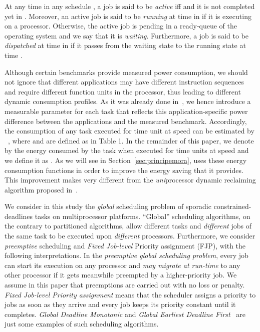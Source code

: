 \documentclass[times, 10pt,twocolumn]{article}
\begin{document}
At any time  in any schedule , a job  is said to be \emph{active} iff  and it is not completed yet in . Moreover, an active job is said to be \emph{running} at time  in  if it is executing on a processor. Otherwise, the active job is pending in a ready-queue of the operating system and we say that it is \emph{waiting}. Furthermore, a job is said to be \emph{dispatched} at time  in  if it passes from the waiting state to the running state at time .

Although certain benchmarks provide measured power consumption, we should not ignore that different applications may have different instruction sequences and require different function units in the processor, thus leading to different dynamic consumption profiles. As it was already done in~\cite{RXu:07}, we hence introduce a measurable parameter  for each task  that reflects this application-specific power difference between the applications and the measured benchmark. Accordingly, the consumption of any task  executed for  time unit at speed  can be estimated by ~\cite{RXu:07}, where  and  are defined as in Table 1. In the remainder of this paper, we denote by  the energy consumed by the task  when executed for  time units at speed  and we define it as . As we will see in Section~\ref{sec:principemora},  uses these energy consumption functions in order to improve the energy saving that it provides. This improvement makes  very different from the \emph{uni}processor dynamic reclaiming algorithm  proposed in~\cite{AyMeMoMe:04}.

\label{sec:scheduler}

We consider in this study the \emph{global} scheduling problem of sporadic constrained-deadlines tasks on multiprocessor platforms. ``Global'' scheduling algorithms, on the contrary to partitioned algorithms, allow different tasks and \emph{different} jobs of the same task to be executed upon \emph{different} processors. Furthermore, we consider \emph{preemptive} scheduling and \emph{Fixed Job-level} Priority assignment (FJP), with the following interpretations. In the \emph{preemptive global scheduling problem}, every job can start its execution on any processor and \emph{may migrate at run-time} to any other processor if it gets meanwhile preempted by a higher-priority job. We assume in this paper that preemptions are carried out with no loss or penalty. \emph{Fixed Job-level Priority assignment} means that the scheduler assigns a priority to jobs as soon as they arrive and every job keeps its priority constant until it completes. \emph{Global Deadline Monotonic} and \emph{Global Earliest Deadline First}~\cite{Baker:03} are just some examples of such scheduling algorithms. 
\end{document}
